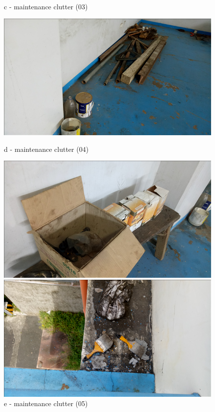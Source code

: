 \begin{figure}
\begin{minipage}[b]{0.3\linewidth}
		\caption*{c - maintenance clutter (03)}
		\label{ch047_wem_housekeeping1}
	\end{minipage}
	\hspace{0.05cm}
	\begin{minipage}[b]{0.3\linewidth}
		\centering
		\includegraphics[width=\textwidth]{figures/fig_ch047_wem_housekeeping2}
		\caption*{d - maintenance clutter (04)}
		\label{ch047_wem_housekeeping2}
	\end{minipage}
	\hspace{0.05cm}
	\begin{minipage}[b]{0.3\linewidth}
		\centering
		\includegraphics[width=\textwidth]{figures/fig_ch047_wem_housekeeping3}
		\caption*{e - maintenance clutter (05)}
		\label{ch047_wem_housekeeping3}
	\end{minipage}
	\hspace{0.05cm}
	\begin{minipage}[b]{0.3\linewidth}
		\centering
		\includegraphics[width=\textwidth]{figures/fig_ch047_wem_housekeeping7}

\end{minipage}
\end{figure}
